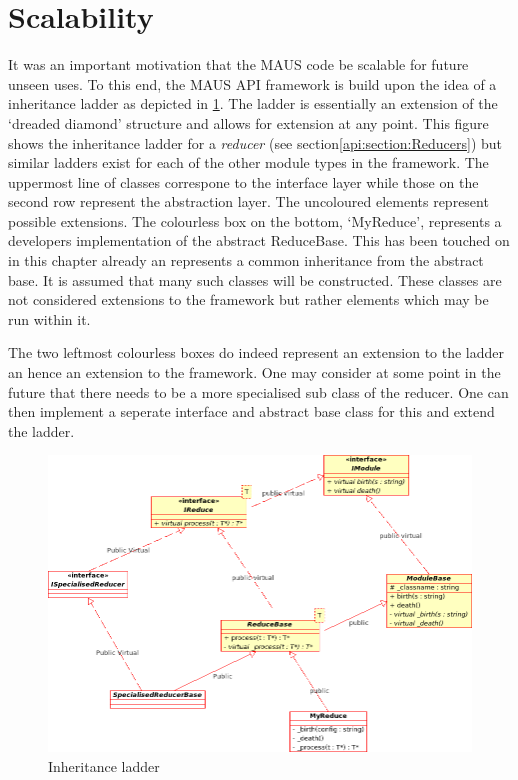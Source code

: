 \section{Scalability}
It was an important motivation that the MAUS code be scalable for future unseen uses. To this end, the MAUS API framework is build upon the idea of a inheritance ladder as depicted in \ref{api:inheritance_ladder}. The ladder is essentially an extension of the `dreaded diamond' structure and allows for extension at any point. This figure shows the inheritance ladder for a \emph{reducer} (see section\ref{api:section:Reducers}) but similar ladders exist for each of the other module types in the framework. The uppermost line of classes correspone to the interface layer while those on the second row represent the abstraction layer. The uncoloured elements represent possible extensions. The colourless box on the bottom, `MyReduce', represents a developers implementation of the abstract ReduceBase. This has been touched on in this chapter already an represents a common inheritance from the abstract base. It is assumed that many such classes will be constructed. These classes are not considered extensions to the framework but rather elements which may be run within it.

The two leftmost colourless boxes do indeed represent an extension to the ladder an hence an extension to the framework. One may consider at some point in the future that there needs to be a more specialised sub class of the reducer. One can then implement a seperate interface and abstract base class for this and extend the ladder.
\begin{figure}[!h]
  \label{api:inheritance_ladder}
  \begin{center}
  \end{center}
    \includegraphics[scale=0.35]{MausApiInheritanceLadder}
  \caption{Inheritance ladder}
\end{figure}
